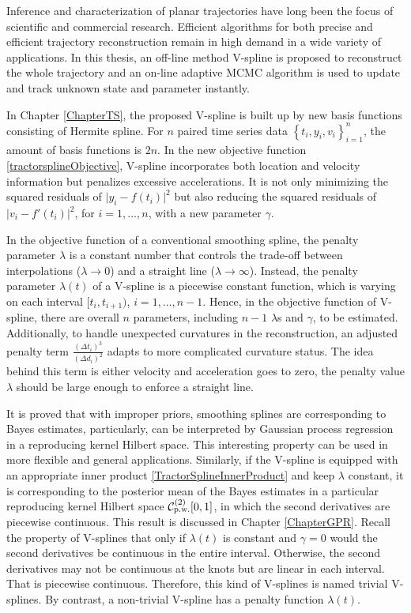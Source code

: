 
Inference and characterization of planar trajectories have long been the focus of scientific and commercial research. Efficient algorithms for both precise and efficient trajectory reconstruction remain in high demand in a wide variety of applications. In this thesis, an off-line method V-spline is proposed to reconstruct the whole trajectory and an on-line adaptive MCMC algorithm is used to update and track unknown state and parameter instantly. 

In Chapter \ref{ChapterTS}, the proposed V-spline is built up by new basis functions consisting of Hermite spline. For $n$ paired time series data $\left\lbrace t_i,y_i,v_i\right\rbrace_{i=1}^{n}$, the amount of basis functions is $2n$. In the new objective function \eqref{tractorsplineObjective}, V-spline incorporates both location and velocity information but penalizes excessive accelerations. It is not only minimizing the squared residuals of $\lvert y_i-f(t_i)\rvert^2$ but also reducing the squared residuals of $\lvert v_i-f'(t_i)\rvert^2$, for $i=1,\ldots,n$, with a new parameter $\gamma$. 

In the objective function of a conventional smoothing spline, the penalty parameter $\lambda$ is a constant number that controls the trade-off between interpolations ($\lambda\to 0$) and a straight line ($\lambda\to \infty$). Instead, the penalty parameter $\lambda(t)$ of a V-spline is a piecewise constant function, which is varying on each interval $[t_i,t_{i+1})$, $i=1,\ldots,n-1$. Hence, in the objective function of V-spline, there are overall $n$ parameters, including $n-1$ $\lambda$s and $\gamma$, to be estimated. Additionally, to handle unexpected curvatures in the reconstruction, an adjusted penalty term $\frac{(\Delta t_i)^3}{(\Delta d_i)^2}$ adapts to more complicated curvature status. The idea behind this term is either velocity and acceleration goes to zero, the penalty value $\lambda$ should be large enough to enforce a straight line. 

It is proved that with improper priors, smoothing splines are corresponding to Bayes estimates, particularly, can be interpreted by Gaussian process regression in a reproducing kernel Hilbert space. This interesting property can be used in more flexible and general applications. Similarly, if the V-spline is equipped with an appropriate inner product \eqref{TractorSplineInnerProduct} and keep $\lambda$ constant, it is corresponding to the posterior mean of the Bayes estimates in a particular reproducing kernel Hilbert space $\mathcal{C}_{\mbox{\scriptsize p.w.}}^{(2)}[0,1]$, in which the second derivatives are piecewise continuous. This result is discussed in Chapter \ref{ChapterGPR}. Recall the property of V-splines that only if $\lambda(t)$ is constant and $\gamma=0$ would the second derivatives be continuous in the entire interval. Otherwise, the second derivatives may not be continuous at the knots but are linear in each interval. That is piecewise continuous. Therefore, this kind of V-splines is named trivial V-splines. By contrast, a non-trivial V-spline has a penalty function $\lambda(t)$. 

